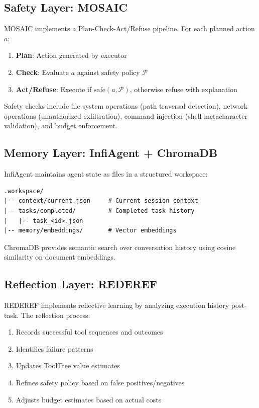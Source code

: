 \documentclass{article}
\begin{document}
\subsection{Safety Layer: MOSAIC}

MOSAIC implements a Plan-Check-Act/Refuse pipeline. For each planned action $a$:
\begin{enumerate}
    \item \textbf{Plan}: Action generated by executor
    \item \textbf{Check}: Evaluate $a$ against safety policy $\mathcal{P}$
    \item \textbf{Act/Refuse}: Execute if $\text{safe}(a, \mathcal{P})$, otherwise refuse with explanation
\end{enumerate}

Safety checks include file system operations (path traversal detection), network operations (unauthorized exfiltration), command injection (shell metacharacter validation), and budget enforcement.

\subsection{Memory Layer: InfiAgent + ChromaDB}

InfiAgent maintains agent state as files in a structured workspace:
\begin{verbatim}
.workspace/
|-- context/current.json     # Current session context
|-- tasks/completed/         # Completed task history
|   |-- task_<id>.json
|-- memory/embeddings/       # Vector embeddings
\end{verbatim}

ChromaDB provides semantic search over conversation history using cosine similarity on document embeddings.

\subsection{Reflection Layer: REDEREF}

REDEREF implements reflective learning by analyzing execution history post-task. The reflection process:
\begin{enumerate}
    \item Records successful tool sequences and outcomes
    \item Identifies failure patterns
    \item Updates ToolTree value estimates
    \item Refines safety policy based on false positives/negatives
    \item Adjusts budget estimates based on actual costs
\end{enumerate}
\end{document}

